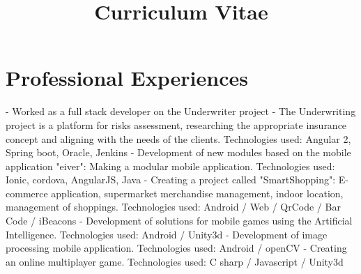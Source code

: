 \documentclass[11pt,a4paper,sans]{moderncv}        %
\title{Curriculum Vitae}                               %
\begin{document}
	\makecvtitle

	\section{Professional Experiences}
    				{- Worked as a full stack developer on the Underwriter project
    				\newline{}
    				- The Underwriting project is a platform for risks assessment, researching the appropriate insurance concept and aligning  with the needs of the clients.
    				\newline{}
    				Technologies used: Angular 2, Spring boot, Oracle,  Jenkins
    				}
				{- Development of new modules based on the mobile application "eiver": Making a modular mobile application.
				\newline{}
				Technologies used: Ionic, cordova, AngularJS, Java
				}
				{- Creating a project called "SmartShopping": E-commerce application, supermarket merchandise management, indoor location, management of shoppings.
				\newline{}
				Technologies used: Android / Web / QrCode / Bar Code / iBeacons
				\newline{}
					\newline{}
				- Development of solutions for mobile games using the Artificial Intelligence.
				\newline{}
				Technologies used: Android / Unity3d
				\newline{}
					\newline{}
				- Development of image processing mobile application.
				\newline{}
				Technologies used: Android / openCV
				}
				{- Creating an online multiplayer game.
				\newline{}
				Technologies used: C sharp / Javascript / Unity3d
				}
\end{document}
